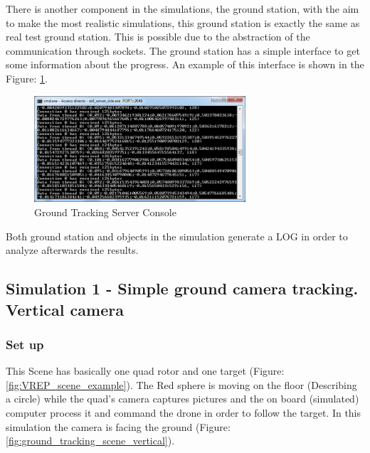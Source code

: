There is another component in the simulations, the ground station, with the aim to make the most realistic simulations, this ground station is exactly the same as real test ground station. This is possible due to the abstraction of the communication through sockets. The ground station has a simple interface to get some information about the progress. An example of this interface is shown in the Figure: \ref{fig:Ground_Tracking_Server_Console}.

\begin{figure}[ht]
	\centering
	\includegraphics[width=0.7\textwidth,natwidth=677,natheight=342]{../Images/c3/ground_tracking_server_console.png}
	\caption{Ground Tracking Server Console}
	\label{fig:Ground_Tracking_Server_Console}
\end{figure}

Both ground station and objects in the simulation generate a LOG in order to analyze afterwards the results.

\subsection{Simulation 1 - Simple ground camera tracking. Vertical camera}
\subsubsection{Set up}
This Scene has basically one quad rotor and one target (Figure: \ref{fig:VREP_scene_example}). The Red sphere is moving on the floor (Describing a circle) while the quad's camera captures pictures and the on board (simulated) computer process it and command the drone in order to follow the target. In this simulation the camera is facing the ground (Figure: \ref{fig:ground_tracking_scene_vertical}).

